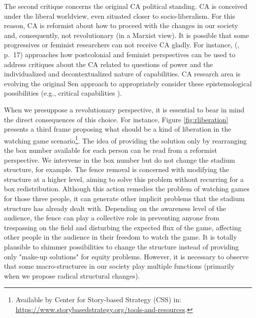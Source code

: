 The second critique concerns the original \gls{CA} political standing. \gls{CA} is conceived under the liberal worldview, even situated closer to socio-liberalism. For this reason, \gls{CA} is reformist about how to proceed with the changes in our society and, consequently, not revolutionary (in a Marxist view). It is possible that some progressives or feminist researchers can not receive \gls{CA} gladly. For instance,  (\citeyear{dejaeghere:2020}, p.~17) approaches how postcolonial and feminist perspectives can be used to address critiques about the \gls{CA} related to questions of power and the individualized and decontextualized nature of capabilities. \gls{CA} research area is evolving the original Sen approach to appropriately consider these epistemological possibilities (e.g., critical capabilities \cite{walker:2010}).

When we presuppose a revolutionary perspective, it is essential to bear in mind the direct consequences of this choice. For instance, Figure \ref{fig:rliberation} presents a third frame proposing what should be a kind of liberation in the watching game scenario\footnote{Available by Center for Story-based Strategy (CSS) in: \url{https://www.storybasedstrategy.org/tools-and-resources}.}. The idea of providing the solution only by rearranging the box number available for each person can be read from a reformist perspective. We intervene in the box number but do not change the stadium structure, for example. The fence removal is concerned with modifying the structure at a higher level, aiming to solve this problem without recurring for a box redistribution. Although this action remedies the problem of watching games for those three people, it can generate other implicit problems that the stadium structure has already dealt with. Depending on the awareness level of the audience, the fence can play a collective role in preventing anyone from trespassing on the field and disturbing the expected flux of the game, affecting other people in the audience in their freedom to watch the game. It is totally plausible to shimmer possibilities to change the structure instead of providing only "make-up solutions" for equity problems. However, it is necessary to observe that some macro-structures in our society play multiple functions (primarily when we propose radical structural changes).

